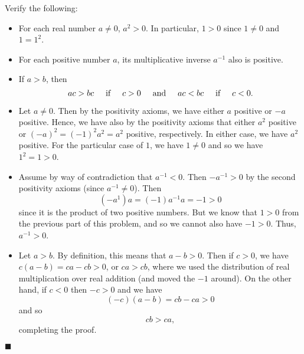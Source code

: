\documentclass[12pt]{article}
\renewcommand{\qed}{\hfill$\blacksquare$}
\renewenvironment{proof}{\begin{addmargin}[1em]{0em}\begin{newproof}}{\end{newproof}\end{addmargin}\qed}
\newenvironment{problem}[2][Problem]{\begin{trivlist}
\item[\hskip \labelsep {\bfseries #1}\hskip \labelsep {\bfseries #2.}]}{\end{trivlist}}
\begin{document}
\begin{problem}{1.1.2}
Verify the following:
\begin{itemize}
	\item For each real number $a\neq 0$, $a^2 > 0$. In particular, $1>0$ since $1\neq 0$ and $1=1^2$.
	\item For each positive number $a$, its multiplicative inverse $a^{-1}$ also is positive.
	\item If $a>b$, then \[ ac>bc \hspace{5mm} \text{if} \hspace{5mm} c>0 \hspace{5mm} \text{and} \hspace{5mm} ac<bc \hspace{5mm} \text{if} \hspace{5mm} c<0.\]
\end{itemize}
\end{problem}
\begin{proof}
\begin{itemize}
	\item Let $a\neq 0$. Then by the positivity axioms, we have either $a$ positive or $-a$ positive. Hence, we have also by the positivity axioms that either $a^2$ positive or $\left(-a\right)^2 = \left(-1\right)^2a^2 = a^2$ positive, respectively. In either case, we have $a^2$ positive.
	For the particular case of $1$, we have $1\neq 0$ and so we have $1^2 = 1 >0$.
	\item Assume by way of contradiction that $a^{-1}<0$. Then $-a^{-1}>0$ by the second positivity axioms (since $a^{-1}\neq 0$). Then \[ \left(-a^{1}\right)a = \left(-1\right) a^{-1}a = -1 >0 \] since it is the product of two positive numbers. But we know that $1>0$ from the previous part of this problem, and so we cannot also have $-1 >0$. Thus, $a^{-1}>0$.
	\item Let $a>b$. By definition, this means that $a-b >0 $. Then if $c>0$, we have $c\left(a-b\right) = ca - cb > 0$, or $ca > cb$, where we used the distribution of real multiplication over real addition (and moved the $-1$ around). On the other hand, if $c<0$ then $-c >0 $ and we have \[ \left(-c\right)\left(a-b\right) = cb - ca >0 \] and so \[ cb > ca, \] completing the proof.
\end{itemize}
\end{proof}
\end{document}
